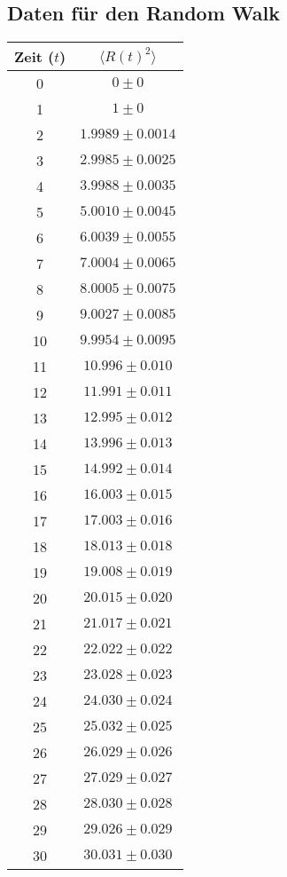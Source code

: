 \documentclass[prb,12pt]{revtex4-2}
\theoremstyle{definition}
\theoremstyle{definition}
\begin{document}
\subsection{Daten für den Random Walk}
\begin{longtable}{cc}
	\toprule
	Zeit ($t$) & $\langle R(t)^2 \rangle $\\\midrule
	0 & $0\pm 0$ \\\midrule
	1 & $1\pm 0$ \\\midrule
	2 & $1.9989\pm 0.0014$ \\\midrule
	3 & $2.9985\pm 0.0025$ \\\midrule
	4 & $3.9988\pm 0.0035$ \\\midrule
	5 & $5.0010\pm 0.0045$ \\\midrule
	6 & $6.0039\pm 0.0055$ \\\midrule
	7 & $7.0004\pm 0.0065$ \\\midrule
	8 & $8.0005\pm 0.0075$ \\\midrule
	9 & $9.0027\pm 0.0085$ \\\midrule
	10 & $9.9954\pm 0.0095$ \\\midrule
	11 & $10.996\pm 0.010$ \\\midrule
	12 & $11.991\pm 0.011$ \\\midrule
	13 & $12.995\pm 0.012$ \\\midrule
	14 & $13.996\pm 0.013$ \\\midrule
	15 & $14.992\pm 0.014$ \\\midrule
	16 & $16.003\pm 0.015$ \\\midrule
	17 & $17.003\pm 0.016$ \\\midrule
	18 & $18.013\pm 0.018$ \\\midrule
	19 & $19.008\pm 0.019$ \\\midrule
	20 & $20.015\pm 0.020$ \\\midrule
	21 & $21.017\pm 0.021$ \\\midrule
	22 & $22.022\pm 0.022$ \\\midrule
	23 & $23.028\pm 0.023$ \\\midrule
	24 & $24.030\pm 0.024$ \\\midrule
	25 & $25.032\pm 0.025$ \\\midrule
	26 & $26.029\pm 0.026$ \\\midrule
	27 & $27.029\pm 0.027$ \\\midrule
	28 & $28.030\pm 0.028$ \\\midrule
	29 & $29.026\pm 0.029$ \\\midrule
	30 & $30.031\pm 0.030$ \\\midrule

\end{longtable}
\end{document}
